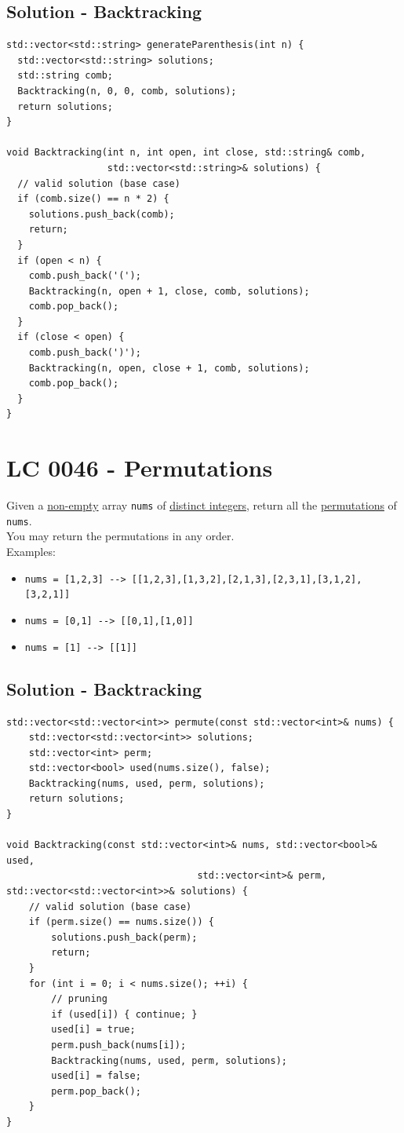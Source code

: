 \subsection*{Solution - Backtracking}
\begin{lstlisting}
std::vector<std::string> generateParenthesis(int n) {
  std::vector<std::string> solutions;
  std::string comb;
  Backtracking(n, 0, 0, comb, solutions);
  return solutions;
}

void Backtracking(int n, int open, int close, std::string& comb,
                  std::vector<std::string>& solutions) {
  // valid solution (base case)
  if (comb.size() == n * 2) {
    solutions.push_back(comb);
    return;
  }
  if (open < n) {
    comb.push_back('(');
    Backtracking(n, open + 1, close, comb, solutions);
    comb.pop_back();
  }
  if (close < open) {
    comb.push_back(')');
    Backtracking(n, open, close + 1, comb, solutions);
    comb.pop_back();
  }
}
\end{lstlisting}

\section{LC 0046 - Permutations}
Given a \ul{non-empty} array {\colorbox{CodeBackground}{\lstinline|nums|}} of \ul{distinct integers}, return all the \ul{permutations} of {\colorbox{CodeBackground}{\lstinline|nums|}}. \\

You may return the permutations in any order.\\

Examples:
\begin{itemize}
	\item {\colorbox{CodeBackground}{\lstinline|nums = [1,2,3] --> [[1,2,3],[1,3,2],[2,1,3],[2,3,1],[3,1,2],[3,2,1]]|}}
	\item {\colorbox{CodeBackground}{\lstinline|nums = [0,1] --> [[0,1],[1,0]]|}}
	\item {\colorbox{CodeBackground}{\lstinline|nums = [1] --> [[1]]|}}
\end{itemize}

\subsection*{Solution - Backtracking}
\begin{lstlisting}
std::vector<std::vector<int>> permute(const std::vector<int>& nums) {
	std::vector<std::vector<int>> solutions;
	std::vector<int> perm;
	std::vector<bool> used(nums.size(), false);
	Backtracking(nums, used, perm, solutions);
	return solutions;
}

void Backtracking(const std::vector<int>& nums, std::vector<bool>& used, 
								  std::vector<int>& perm, std::vector<std::vector<int>>& solutions) {
	// valid solution (base case)
	if (perm.size() == nums.size()) {
		solutions.push_back(perm);
		return;
	}
	for (int i = 0; i < nums.size(); ++i) {
		// pruning
		if (used[i]) { continue; }
		used[i] = true;
		perm.push_back(nums[i]);
		Backtracking(nums, used, perm, solutions);
		used[i] = false;
		perm.pop_back();
	}
}
\end{lstlisting}

